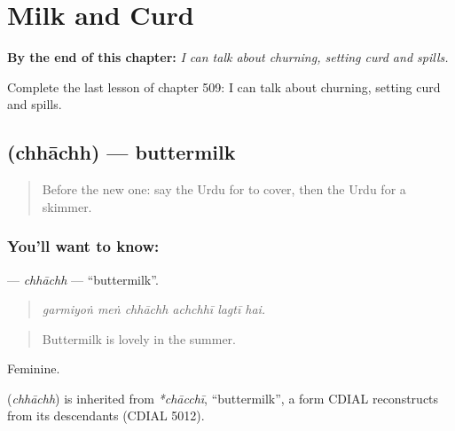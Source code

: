 
\chapter{Milk and Curd}
\label{ch:ur-milk-and-curd}

\begin{chapteropening}
\textbf{By the end of this chapter:} \emph{I can talk about churning, setting curd and spills.}

Complete the last lesson of chapter 509: I can talk about churning, setting curd and spills.
\end{chapteropening}

\section[\texorpdfstring{\ur{چھاچھ} (chhāchh)}{چھاچھ (chhāchh)}]{ (chhāchh) — buttermilk}

\label{lesson:UR-C509-chhachh}



\begin{quote}
Before the new one: say the Urdu for to cover, then the Urdu for a skimmer.
\end{quote}

\subsection*{You'll want to know: }
\textbf{} — \emph{chhāchh} — \textquotedblleft{}buttermilk\textquotedblright{}.

\begin{quote}
     
\end{quote}

\begin{quote}
\emph{garmiyoṅ meṅ chhāchh achchhī lagtī hai.}
\end{quote}

\begin{quote}
Buttermilk is lovely in the summer.
\end{quote}

Feminine.

\begin{cousinweb}
\textbf{} (\emph{chhāchh}) is inherited from \emph{*chācchī}, \textquotedblleft{}buttermilk\textquotedblright{}, a form CDIAL reconstructs from its descendants (CDIAL 5012).
\end{cousinweb}

